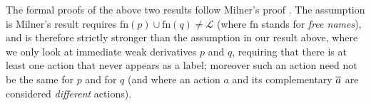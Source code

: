 The formal proofs  of the above two results  follow Milner's proof
\cite{Mil89}. The assumption is Milner's result 
requires  $\mathrm{fn}(p) \cup
\mathrm{fn}(q) \neq \mathscr{L}$ (where $\mathrm{fn}$ stands for \emph{free
  names}), and is therefore strictly stronger than the assumption in
our result above, where we only look at immediate weak
derivatives $p$ and $q$, requiring that there is at least one action
that never appears as a label; moreover such an action need not be
the same for $p$ and for $q$
(and where an action $a$ and its complementary  $\overline{a}$ are
considered \emph{different} actions).


